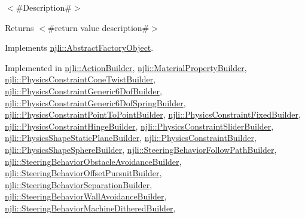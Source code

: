 $<$\#\+Description\#$>$

\begin{DoxyReturn}{Returns}
$<$\#return value description\#$>$ 
\end{DoxyReturn}


Implements \mbox{\hyperlink{classnjli_1_1_abstract_factory_object_a838f4fa7e65cace6098aab5222892942}{njli\+::\+Abstract\+Factory\+Object}}.



Implemented in \mbox{\hyperlink{classnjli_1_1_action_builder_ad3f87a956a7a92ea16a5f35f9d1608f7}{njli\+::\+Action\+Builder}}, \mbox{\hyperlink{classnjli_1_1_material_property_builder_a6965c5e122844746df524bb41aa0dc7b}{njli\+::\+Material\+Property\+Builder}}, \mbox{\hyperlink{classnjli_1_1_physics_constraint_cone_twist_builder_ab6e71b3e8a4a7703efad638b1363af93}{njli\+::\+Physics\+Constraint\+Cone\+Twist\+Builder}}, \mbox{\hyperlink{classnjli_1_1_physics_constraint_generic6_dof_builder_af24c273d394d1b66f41ceb82d36a68d9}{njli\+::\+Physics\+Constraint\+Generic6\+Dof\+Builder}}, \mbox{\hyperlink{classnjli_1_1_physics_constraint_generic6_dof_spring_builder_a929e3396809d09d2ae4ee6ed9546e8e3}{njli\+::\+Physics\+Constraint\+Generic6\+Dof\+Spring\+Builder}}, \mbox{\hyperlink{classnjli_1_1_physics_constraint_point_to_point_builder_a462ed75523ba1ee0fd259a6184e6e2be}{njli\+::\+Physics\+Constraint\+Point\+To\+Point\+Builder}}, \mbox{\hyperlink{classnjli_1_1_physics_constraint_fixed_builder_aa726a4fbb431297736129c816d215977}{njli\+::\+Physics\+Constraint\+Fixed\+Builder}}, \mbox{\hyperlink{classnjli_1_1_physics_constraint_hinge_builder_a08d772c74b00685234120bc33b1ac3bc}{njli\+::\+Physics\+Constraint\+Hinge\+Builder}}, \mbox{\hyperlink{classnjli_1_1_physics_constraint_slider_builder_a2b6b73ef4e284e4e138a657a8848c5c0}{njli\+::\+Physics\+Constraint\+Slider\+Builder}}, \mbox{\hyperlink{classnjli_1_1_physics_shape_static_plane_builder_a29fd90a50558d4530885200bd5e3f76d}{njli\+::\+Physics\+Shape\+Static\+Plane\+Builder}}, \mbox{\hyperlink{classnjli_1_1_physics_constraint_builder_a7d19e806ec306322aeabdee8e9257b3b}{njli\+::\+Physics\+Constraint\+Builder}}, \mbox{\hyperlink{classnjli_1_1_physics_shape_sphere_builder_a454d6caf6e56d680e468166e7c75d5cf}{njli\+::\+Physics\+Shape\+Sphere\+Builder}}, \mbox{\hyperlink{classnjli_1_1_steering_behavior_follow_path_builder_a64c00278b66cc5c5b7c67219f97834b2}{njli\+::\+Steering\+Behavior\+Follow\+Path\+Builder}}, \mbox{\hyperlink{classnjli_1_1_steering_behavior_obstacle_avoidance_builder_a3b201a2ae4dc678d0b9948ef4ce9abd5}{njli\+::\+Steering\+Behavior\+Obstacle\+Avoidance\+Builder}}, \mbox{\hyperlink{classnjli_1_1_steering_behavior_offset_pursuit_builder_aefb4cd79488a32db5dd634a85dff6525}{njli\+::\+Steering\+Behavior\+Offset\+Pursuit\+Builder}}, \mbox{\hyperlink{classnjli_1_1_steering_behavior_separation_builder_a478c5777dc02809c78aa44e0453be2d7}{njli\+::\+Steering\+Behavior\+Separation\+Builder}}, \mbox{\hyperlink{classnjli_1_1_steering_behavior_wall_avoidance_builder_a070082058461628d11195f06f8f3b8a3}{njli\+::\+Steering\+Behavior\+Wall\+Avoidance\+Builder}}, \mbox{\hyperlink{classnjli_1_1_steering_behavior_machine_dithered_builder_ab5e1174628702255c567b6a7025dd2ec}{njli\+::\+Steering\+Behavior\+Machine\+Dithered\+Builder}}, 